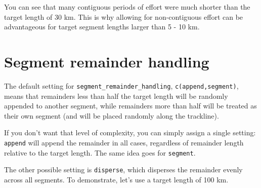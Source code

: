 \documentclass[
]{book}
\newenvironment{Shaded}{\begin{snugshade}}{\end{snugshade}}
\newcommand{\CommentTok}[1]{\textcolor[rgb]{0.56,0.35,0.01}{\textit{#1}}}
\newcommand{\ControlFlowTok}[1]{\textcolor[rgb]{0.13,0.29,0.53}{\textbf{#1}}}
\newcommand{\DataTypeTok}[1]{\textcolor[rgb]{0.13,0.29,0.53}{#1}}
\newcommand{\DecValTok}[1]{\textcolor[rgb]{0.00,0.00,0.81}{#1}}
\newcommand{\KeywordTok}[1]{\textcolor[rgb]{0.13,0.29,0.53}{\textbf{#1}}}
\newcommand{\NormalTok}[1]{#1}
\newcommand{\OperatorTok}[1]{\textcolor[rgb]{0.81,0.36,0.00}{\textbf{#1}}}
\newcommand{\OtherTok}[1]{\textcolor[rgb]{0.56,0.35,0.01}{#1}}
\newcommand{\StringTok}[1]{\textcolor[rgb]{0.31,0.60,0.02}{#1}}
\begin{document}
You can see that many contiguous periods of effort were much shorter than the target length of 30 km. This is why allowing for non-contiguous effort can be advantageous for target segment lengths larger than 5 - 10 km.

\hypertarget{segment-remainder-handling}{%
\section*{Segment remainder handling}\label{segment-remainder-handling}}

The default setting for \texttt{segment\_remainder\_handling}, \texttt{c(\textquotesingle{}append\textquotesingle{},\textquotesingle{}segment\textquotesingle{})}, means that remainders less than half the target length will be randomly appended to another segment, while remainders more than half will be treated as their own segment (and will be placed randomly along the trackline).

If you don't want that level of complexity, you can simply assign a single setting: \texttt{\textquotesingle{}append\textquotesingle{}} will append the remainder in all cases, regardless of remainder length relative to the target length. The same idea goes for \texttt{\textquotesingle{}segment\textquotesingle{}}.

The other possible setting is \texttt{\textquotesingle{}disperse\textquotesingle{}}, which disperses the remainder evenly across all segments. To demonstrate, let's use a target length of 100 km.

\begin{Shaded}
\end{Shaded}
\end{document}
